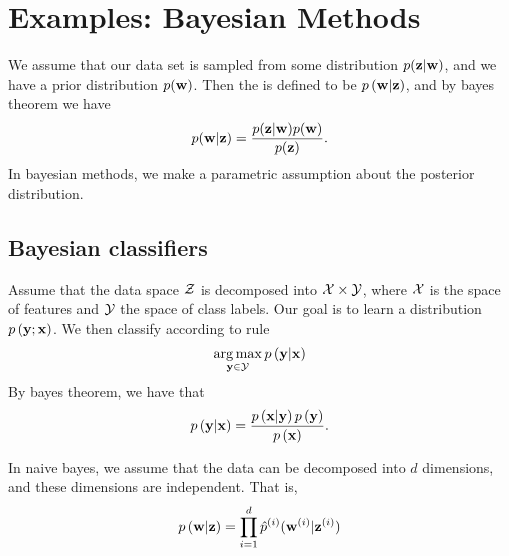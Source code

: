 \documentclass[thesis.tex]{subfiles}
\newcommand{\p}[1]{p\left({#1}\right)}
\newcommand{\psup}[2]{\hat p^{#1}({#2})}
\begin{document}

\section{Examples: Bayesian Methods}

We assume that our data set is sampled from some distribution $p(\mathbf z|\mathbf w)$,
and we have a prior distribution $p(\mathbf w)$.
Then the  is defined to be $\p{\w|\z}$,
and by bayes theorem we have
\begin{equation}
    p(\mathbf w | \mathbf z) = \frac{p(\mathbf z|\mathbf w)p(\mathbf w)}{p(\mathbf z)}
    .
\end{equation}
In bayesian methods, we make a parametric assumption about the posterior distribution.



\subsection{Bayesian classifiers}

Assume that the data space ${\mathcal Z}$ is decomposed into $\mathcal{X}\times \mathcal{Y}$,
where $\mathcal{X}$ is the space of features and $\mathcal{Y}$ the space of class labels.
Our goal is to learn a distribution $\p{\y ; \x}$.
We then classify according to rule
\begin{equation}
    \argmax_{\y\in\Y} \p{\y | \x}
    \end{equation}
By bayes theorem, we have that
\begin{equation}
    \p{\y | \x} = \frac{\p{\x | \y}\p{\y}}{\p{\x}}
    .
\end{equation}

In naive bayes, we assume that the data can be decomposed into $d$ dimensions,
and these dimensions are independent.
That is,
\begin{equation}
    \p{\w | \z} = \prod_{i=1}^d \psup{(i)}{\w^{(i)} | \z^{(i)}}
\end{equation}
\end{document}
